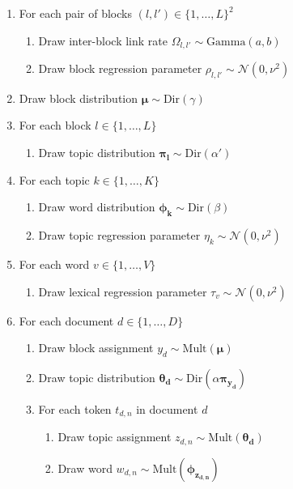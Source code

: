 \begin{small}
\begin{enumerate}[leftmargin=*,noitemsep]
\item For each pair of blocks $(l,l')\in \{1,\ldots,L\}^2$
    \begin{enumerate}
    \item Draw inter-block link rate $\Omega_{l,l'}\sim \mathrm{Gamma}(a,b)$
    \item Draw block regression parameter $\rho_{l,l'}\sim \mathcal{N}(0,\nu^2)$
    \end{enumerate}
\item Draw block distribution $\bm{\mu}\sim \mathrm{Dir}(\gamma)$
\item For each block $l\in \{1,\ldots,L\}$
    \begin{enumerate}
    \item Draw topic distribution $\bm{\pi_l}\sim \mathrm{Dir}(\alpha')$
    \end{enumerate}
\item For each topic $k\in \{1,\ldots,K\}$
    \begin{enumerate}
    \item Draw word distribution $\bm{\phi_k}\sim \mathrm{Dir}(\beta)$
    \item Draw topic regression parameter $\eta_k\sim \mathcal{N}(0,\nu^2)$
    \end{enumerate}
\item For each word $v\in \{1,\ldots,V\}$
    \begin{enumerate}
    \item Draw lexical regression parameter $\tau_v\sim \mathcal{N}(0,\nu^2)$
    \end{enumerate}
\item For each document $d\in \{1,\ldots,D\}$
    \begin{enumerate}
    \item Draw block assignment $y_d\sim \mathrm{Mult}(\bm{\mu})$
    \item Draw topic distribution $\bm{\theta_d}\sim \mathrm{Dir}(\alpha \bm{\pi_{y_d}})$
    \item For each token $t_{d,n}$ in document $d$
        \begin{enumerate}
        \item Draw topic assignment $z_{d,n}\sim \mathrm{Mult}(\bm{\theta_d})$
        \item Draw word $w_{d,n}\sim \mathrm{Mult}(\bm{\phi_{z_{d,n}}})$
        \end{enumerate}

\end{enumerate}
\end{enumerate}
\end{small}
